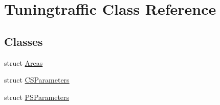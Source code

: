 \hypertarget{class_tuningtraffic}{}\section{Tuningtraffic Class Reference}
\label{class_tuningtraffic}
\subsection*{Classes}
\begin{DoxyCompactItemize}
\item 
struct \hyperlink{struct_tuningtraffic_1_1_areas}{Areas}
\item 
struct \hyperlink{struct_tuningtraffic_1_1_c_s_parameters}{C\+S\+Parameters}
\item 
struct \hyperlink{struct_tuningtraffic_1_1_p_s_parameters}{P\+S\+Parameters}
\end{DoxyCompactItemize}
